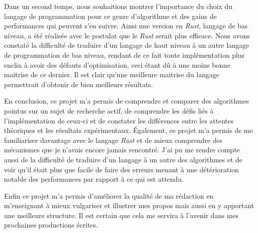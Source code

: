 \documentclass[12pt,a4paper]{article}
\begin{document}
Dans un second temps, nous souhaitions montrer l'importance du choix du langage de programmation pour ce genre d'algorithme et des gains de performances qui peuvent s'en suivre. Ainsi une version en \emph{Rust}, langage de bas niveau, a été réalisée avec le postulat que le \emph{Rust} serait plus efficace. Nous avons constaté la difficulté de traduire d'un langage de haut niveau à un autre langage de programmation de bas niveau, rendant de ce fait toute implémentation plus enclin à avoir des défauts d'optimisation, ceci étant dû à une moins bonne maitrise de ce dernier. Il est clair qu'une meilleure maitrise du langage permettrait d'obtenir de bien meilleurs résultats.

En conclusion, ce projet m'a permis de comprendre et comparer des algorithmes pointus sur un sujet de recherche actif, de comprendre les défis liés à l'implémentation de ceux-ci et de constater les différences entre les attentes théoriques et les résultats expérimentaux. Également, ce projet m'a permis de me familiariser davantage avec le langage \emph{Rust} et de mieux comprendre des mécanismes que je n'avais encore jamais rencontré. J'ai pu me rendre compte aussi de la difficulté de traduire d'un langage à un autre des algorithmes et de voir qu'il était plus que facile de faire des erreurs menant à une détérioration notable des performances par rapport à ce qui est attendu.

Enfin ce projet m'a permis d'améliorer la qualité de ma rédaction en m'enseignant à mieux vulgariser et illustrer mes propos mais aussi en y apportant une meilleure structure. Il est certain que cela me servira à l'avenir dans mes prochaines productions écrites.


\newpage


\end{document}

